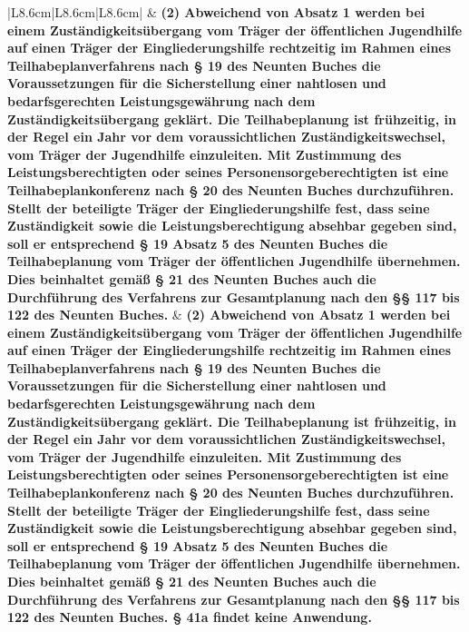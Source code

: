 \documentclass[10pt,a4paper,landscape]{article}
\begin{document}
\begin{longtable}{|L{8.6cm}|L{8.6cm}|L{8.6cm}|}
 & \textbf{(2) Abweichend von Absatz 1 werden bei einem Zuständigkeitsübergang vom Träger der öffentlichen Jugendhilfe auf einen Träger der Eingliederungshilfe rechtzeitig im Rahmen eines Teilhabeplanverfahrens nach \S{} 19 des Neunten Buches die Voraussetzungen für die Sicherstellung einer nahtlosen und bedarfsgerechten Leistungsgewährung nach dem Zuständigkeitsübergang geklärt. Die Teilhabeplanung ist frühzeitig, in der Regel ein Jahr vor dem voraussichtlichen Zuständigkeitswechsel, vom Träger der Jugendhilfe einzuleiten. Mit Zustimmung des Leistungsberechtigten oder seines Personensorgeberechtigten ist eine Teilhabeplankonferenz nach \S{} 20 des Neunten Buches durchzuführen. Stellt der beteiligte Träger der Eingliederungshilfe fest, dass seine Zuständigkeit sowie die Leistungsberechtigung absehbar gegeben sind, soll er entsprechend \S{} 19 Absatz 5 des Neunten Buches die Teilhabeplanung vom Träger der öffentlichen Jugendhilfe übernehmen. Dies beinhaltet gemäß \S{} 21 des Neunten Buches auch die Durchführung des Verfahrens zur Gesamtplanung nach den \S{}\S{} 117 bis 122 des Neunten Buches. } & \textbf{(2) Abweichend von Absatz 1 werden bei einem Zuständigkeitsübergang vom Träger der öffentlichen Jugendhilfe auf einen Träger der Eingliederungshilfe rechtzeitig im Rahmen eines Teilhabeplanverfahrens nach \S{} 19 des Neunten Buches die Voraussetzungen für die Sicherstellung einer nahtlosen und bedarfsgerechten Leistungsgewährung nach dem Zuständigkeitsübergang geklärt. Die Teilhabeplanung ist frühzeitig, in der Regel ein Jahr vor dem voraussichtlichen Zuständigkeitswechsel, vom Träger der Jugendhilfe einzuleiten. Mit Zustimmung des Leistungsberechtigten oder seines Personensorgeberechtigten ist eine Teilhabeplankonferenz nach \S{} 20 des Neunten Buches durchzuführen. Stellt der beteiligte Träger der Eingliederungshilfe fest, dass seine }\textbf{Zuständigkeit sowie die Leistungsberechtigung absehbar gegeben sind, soll er entsprechend \S{} 19 Absatz 5 des Neunten Buches die Teilhabeplanung vom Träger der öffentlichen Jugendhilfe übernehmen. Dies beinhaltet gemäß \S{} 21 des Neunten Buches auch die Durchführung des Verfahrens zur Gesamtplanung nach den \S{}\S{} 117 bis 122 des Neunten Buches. \S{} 41a findet keine Anwendung. } \\
\hline

\end{longtable}
\end{document}
